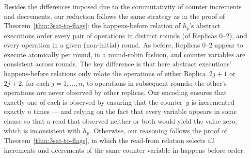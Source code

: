      Besides the differences imposed due to the commutativity of counter increments and decrements, our reduction follows the same strategy as in the proof of Theorem~\ref{thm:3sat-to-flags}: the happens-before relation of $h_p$’s abstract executions order every pair of operations in distinct rounds (of Replicas 0–2), and every operation in a given (non-initial) round. As before, Replicas 0–2 appear to execute atomically per round, in a round-robin fashion, and counter variables are consistent across rounds. The key difference is that here abstract executions’ happens-before relations only relate the operations of either Replica~$2j\!+\!1$ or $2j\!+\!2$, for each $j = 1, \ldots, n$, to operations in subsequent rounds: the other’s operations are never observed by other replicas. Our encoding ensures that exactly one of each is observed by ensuring that the counter~$y$ is incremented exactly $n$ times — and relying on the fact that every variable appears in some clause so that a read that observed neither or both would yield the value zero, which is inconsistent with $h_p$. Otherwise, our reasoning follows the proof of Theorem~\ref{thm:3sat-to-flags}, in which the read-from relation selects all increments and decrements of the same counter variable in happens-before order.
\vspace{-2mm}




